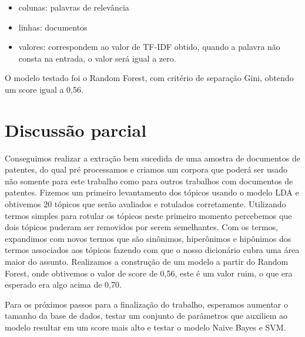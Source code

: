 \begin{itemize}
  \item colunas: palavras de relevância
  \item linhas: documentos
  \item valores: correspondem ao valor de TF-IDF obtido, quando a palavra não consta na entrada, o valor será igual a zero.
\end{itemize}
	
	O modelo testado foi o Random Forest, com critério de separação Gini, obtendo um score igual a 0,56.

\section{Discussão parcial}

Conseguimos realizar a extração bem sucedida de uma amostra de documentos de patentes, do qual pré processamos e criamos um corpora que poderá ser usado não somente para este trabalho como para outros trabalhos com documentos de patentes. Fizemos um primeiro levantamento dos tópicos usando o modelo LDA e obtivemos 20 tópicos que serão avaliados e rotulados corretamente. 
Utilizando termos simples para rotular os tópicos neste primeiro momento percebemos que dois tópicos puderam ser removidos por serem semelhantes. Com os termos, expandimos com novos termos que são sinônimos, hiperônimos e hipônimos dos termos associados aos tópicos fazendo com que o nosso dicionário cubra uma área maior do assunto. 
Realizamos a construção de um modelo a partir do Random Forest, onde obtivemos o valor de score de 0,56, este é um valor ruim, o que era esperado era algo acima de 0,70. 

Para os próximos passos para a finalização do trabalho, esperamos aumentar o tamanho da base de dados, testar um conjunto de parâmetros que auxiliem ao modelo resultar em um score mais alto e testar o modelo Naive Bayes e SVM.

